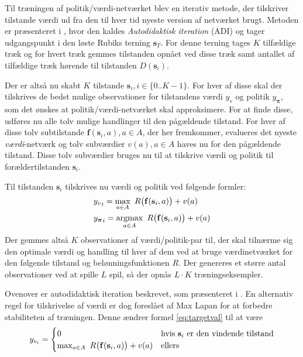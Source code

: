 \documentclass[../main.tex]{subfiles}
\begin{document}
Til træningen af politik/værdi-netværket blev en iterativ metode, der tilskriver tilstande værdi ud fra den til hver tid nyeste version af netværket brugt. 
Metoden er præsenteret i \cite[4.1]{HumansBeGone}, hvor den kaldes \textit{Autodidaktisk iteration} (ADI) og tager udgangspunkt i den løste Rubiks terning \(\mathbf s_T\).
For denne terning tages \(K\) tilfældige træk og for hvert træk gemmes tilstanden opnået ved disse træk samt antallet af tilfældige træk hørende til tilstanden \(D(\mathbf s_i)\). 

Der er altså nu skabt \(K\) tilstande \(\mathbf{s}_{i}, i\in\{0..K-1\}\). For hver af disse skal der tilskrives de bedst mulige observationer for tilstandens værdi \(y_v\) og politik \(y_{\bm \pi }\), som det ønskes at politik/værdi-netværket skal approksimere.
For at finde disse, udføres nu alle tolv mulige handlinger til den pågældende tilstand. For hver af disse tolv subtilstande \(\mathbf f(\mathbf s_i, a), a\in A\), der her fremkommer, evalueres det nyeste \textit{værdi}-netværk og tolv subværdier \(v(a), a\in A\) haves nu for den pågældende tilstand.
Disse tolv subværdier bruges nu til at tilskrive værdi og politik til forældertilstanden \(\mathbf s _i\).	 

Til tilstanden \(\mathbf s _i\) tilskrives nu værdi og politik ved følgende formler:
\begin{align}
	&{y_{v}}_i= \operatorname*{max}_{a\in A}\  R\big(\mathbf f(\mathbf s_i, a)\big)+v(a)\label{eq:targetval}
	\\
	& {y_{\bm \pi }}_i = \operatorname*{argmax}_{a\in A} \  R\big(\mathbf f(\mathbf s_i, a)\big)+v(a) \label{eq:targetpi}
\end{align}
Der gemmes altså \(K\) observationer af værdi/politik-par til, der skal tilnærme sig den optimale værdi og handling til hver af dem ved at bruge værdinetværket for den følgende tilstand og belønningsfunktionen \(R\). 
Der genereres et større antal observationer ved at spille \(L\) spil, så der opnås \(L\cdot K\) træningseksempler. 

Ovenover er autodidaktisk iteration beskrevet, som præsenteret i \cite{HumansBeGone}. En alternativ regel for tilskrivelse af værdi er dog foreslået af Max Lapan \cite{RubiksMedium} for at forbedre stabiliteten af træningen. Denne ændrer formel \eqref{eq:targetval} til at være
\begin{equation}\label{eq:lapantargeval}
y_{v_i}= 
\begin{cases}
0 & \text{hvis \(\mathbf s_i\) er den vindende tilstand}\\
\operatorname*{max}_{a\in A}\  R\big(\mathbf f(\mathbf s_i, a)\big)+v(a) &\text{ellers}
\end{cases}
\end{equation}
\end{document}
